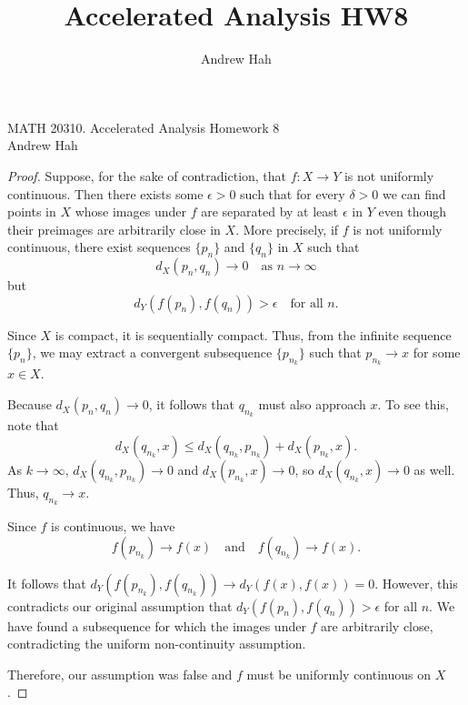 \documentclass[11pt]{article}
\title{Accelerated Analysis HW8}
\author{Andrew Hah}
\begin{document}
\pagestyle{plain}
\begin{center}
{\Large MATH 20310. Accelerated Analysis Homework 8} \\ 
\vspace{.2in}  
Andrew Hah \\
\end{center}

\begin{exercise}{10}
    \begin{proof}
        Suppose, for the sake of contradiction, that $f: X \to Y$ is not uniformly continuous. Then there exists some $\epsilon > 0$ such that for every $\delta > 0$ we can find points in $X$ whose images under $f$ are separated by at least $\epsilon$ in $Y$ even though their preimages are arbitrarily close in $X$. More precisely, if $f$ is not uniformly continuous, there exist sequences $\{p_n\}$ and $\{q_n\}$ in $X$ such that
\[
d_X(p_n, q_n) \to 0 \quad \text{as } n \to \infty
\]
but
\[
d_Y(f(p_n), f(q_n)) > \epsilon \quad \text{for all } n.
\]

Since $X$ is compact, it is sequentially compact. Thus, from the infinite sequence $\{p_n\}$, we may extract a convergent subsequence $\{p_{n_k}\}$ such that $p_{n_k} \to x$ for some $x \in X$.

Because $d_X(p_n, q_n) \to 0$, it follows that $q_{n_k}$ must also approach $x$. To see this, note that
\[
d_X(q_{n_k}, x) \leq d_X(q_{n_k}, p_{n_k}) + d_X(p_{n_k}, x).
\]
As $k \to \infty$, $d_X(q_{n_k}, p_{n_k}) \to 0$ and $d_X(p_{n_k}, x) \to 0$, so $d_X(q_{n_k}, x) \to 0$ as well. Thus, $q_{n_k} \to x$.

Since $f$ is continuous, we have
\[
f(p_{n_k}) \to f(x) \quad \text{and} \quad f(q_{n_k}) \to f(x).
\]

It follows that $d_Y(f(p_{n_k}), f(q_{n_k})) \to d_Y(f(x), f(x)) = 0$. However, this contradicts our original assumption that $d_Y(f(p_n), f(q_n)) > \epsilon$ for all $n$. We have found a subsequence for which the images under $f$ are arbitrarily close, contradicting the uniform non-continuity assumption.

Therefore, our assumption was false and $f$ must be uniformly continuous on $X$.
    \end{proof}
\end{exercise}
\end{document}
